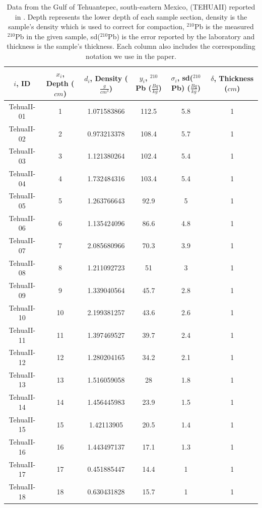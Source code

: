 \documentclass [10pt] {article}
\begin{document}
\begin{table}[h!]
\centering
    \begin{tabular}{|c| c| c| c| c| c|}
\hline
	    $i$, ID & $x_i$, Depth ($cm$)  & $d_i$, Density ($\frac{g}{cm^3}$)  & $y_i$, $^{210}$Pb ($\frac{Bq}{kg}$) & $\sigma_i$, sd($^{210}$Pb) ($\frac{Bq}{kg}$) & $\delta$, Thickness ($cm$)   \\
\hline
TehuaII-01  & 1  & 1.071583866  & 112.5  & 5.8  & 1\\
TehuaII-02  & 2  & 0.973213378  & 108.4  & 5.7  & 1\\
TehuaII-03  & 3  & 1.121380264  & 102.4  & 5.4  & 1\\
TehuaII-04  & 4  & 1.732484316  & 103.4  & 5.4  & 1\\
TehuaII-05  & 5  & 1.263766643  & 92.9  & 5  & 1\\
TehuaII-06  & 6  & 1.135424096  & 86.6  & 4.8  & 1\\
TehuaII-07  & 7  & 2.085680966  & 70.3  & 3.9  & 1\\
TehuaII-08  & 8  & 1.211092723  & 51  & 3  & 1\\
TehuaII-09  & 9  & 1.339040564  & 45.7  & 2.8  & 1\\
TehuaII-10  & 10  & 2.199381257  & 43.6  & 2.6  & 1\\
TehuaII-11  & 11  & 1.397469527  & 39.7  & 2.4  & 1\\
TehuaII-12  & 12  & 1.280204165  & 34.2  & 2.1  & 1\\
TehuaII-13  & 13  & 1.516059058  & 28  & 1.8  & 1\\
TehuaII-14  & 14  & 1.456445983  & 23.9  & 1.5  & 1\\
TehuaII-15  & 15  & 1.42113905  & 20.5  & 1.4  & 1\\
\hline
\dotfill
TehuaII-16  & 16  & 1.443497137  & 17.1  & 1.3  & 1\\
TehuaII-17  & 17  & 0.451885447  & 14.4  & 1  & 1\\
TehuaII-18  & 18  & 0.630431828  & 15.7  & 1  & 1\\
\hline
    \end{tabular}
	\caption{Data from the Gulf of Tehuantepec, south-eastern Mexico, (TEHUAII) reported in \citet{Sanchez-Cabeza2012}. Depth represents the lower depth of each sample section, density is the sample's density which is used to correct for compaction, $^{210}$Pb is the measured $^{210}$Pb in the given sample, sd($^{210}$Pb) is the error reported by the laboratory and thickness is the sample's thickness. Each column also includes the corresponding notation we use in the paper.}
	\label{tab:tehuaii}
\end{table}
\end{document}
